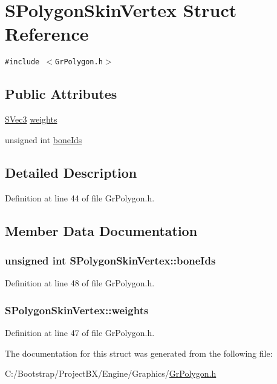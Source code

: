 \hypertarget{struct_s_polygon_skin_vertex}{
\section{SPolygonSkinVertex Struct Reference}
\label{struct_s_polygon_skin_vertex}
}
{\tt \#include $<$GrPolygon.h$>$}

\subsection*{Public Attributes}
\begin{CompactItemize}
\item 
\hyperlink{struct_s_vec3}{SVec3} \hyperlink{struct_s_polygon_skin_vertex_59d28238176971aba70b637ebd7d782c}{weights}
\item 
unsigned int \hyperlink{struct_s_polygon_skin_vertex_9ac8bcae4f9f8601471896a49ea4d57e}{boneIds}
\end{CompactItemize}


\subsection{Detailed Description}


Definition at line 44 of file GrPolygon.h.

\subsection{Member Data Documentation}
\hypertarget{struct_s_polygon_skin_vertex_9ac8bcae4f9f8601471896a49ea4d57e}{
\subsubsection[{boneIds}]{\setlength{\rightskip}{0pt plus 5cm}unsigned int {\bf SPolygonSkinVertex::boneIds}}}
\label{struct_s_polygon_skin_vertex_9ac8bcae4f9f8601471896a49ea4d57e}




Definition at line 48 of file GrPolygon.h.\hypertarget{struct_s_polygon_skin_vertex_59d28238176971aba70b637ebd7d782c}{
\subsubsection[{weights}]{ {\bf SPolygonSkinVertex::weights}}}
\label{struct_s_polygon_skin_vertex_59d28238176971aba70b637ebd7d782c}




Definition at line 47 of file GrPolygon.h.

The documentation for this struct was generated from the following file:\begin{CompactItemize}
\item 
C:/Bootstrap/ProjectBX/Engine/Graphics/\hyperlink{_gr_polygon_8h}{GrPolygon.h}\end{CompactItemize}
